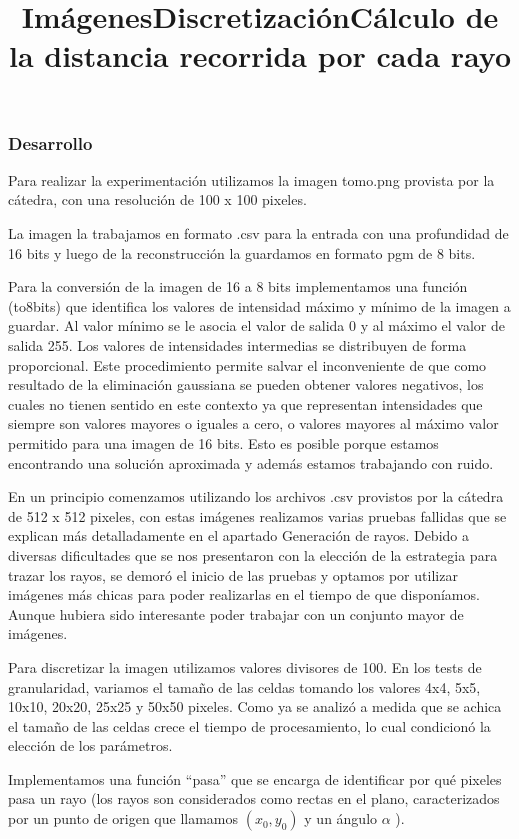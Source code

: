 \subsubsection*{Desarrollo}

\title {Imágenes}

\par Para realizar la experimentación utilizamos la imagen tomo.png provista por la cátedra, con una resolución de 100 x 100 pixeles.
\par La imagen la trabajamos en formato .csv para la entrada con una profundidad de 16 bits y luego de la reconstrucción la guardamos en formato pgm de 8 bits.
\par Para la conversión de la imagen de 16 a 8 bits implementamos una función (to8bits) que identifica los valores de intensidad máximo y mínimo de la imagen a guardar. Al valor mínimo se le asocia el valor de salida 0 y al máximo el valor de salida 255. Los valores de intensidades intermedias se distribuyen de forma proporcional. Este procedimiento permite salvar el inconveniente de que como resultado de la eliminación gaussiana se pueden obtener valores negativos, los cuales no tienen sentido en este contexto ya que representan intensidades que siempre son valores mayores o iguales a cero, o valores mayores al máximo valor permitido para una imagen de 16 bits. Esto es posible porque estamos encontrando una solución aproximada y además estamos trabajando con ruido.

\par En un principio comenzamos utilizando los archivos .csv provistos por la cátedra de 512 x 512 pixeles, con estas imágenes realizamos varias pruebas fallidas que se explican más detalladamente en el apartado Generación de rayos. Debido a diversas dificultades que se nos presentaron con la elección de la estrategia para trazar los rayos, se demoró el inicio de las pruebas y optamos por utilizar imágenes más chicas para poder realizarlas en el tiempo de que disponíamos. Aunque hubiera sido interesante poder trabajar con un conjunto mayor de imágenes.

\title {Discretización} Para discretizar la imagen utilizamos valores divisores de 100. En los tests de granularidad, variamos el tamaño de las celdas tomando los valores 4x4, 5x5, 10x10, 20x20, 25x25 y 50x50 pixeles. Como ya se analizó a medida que se achica el tamaño de las celdas crece el tiempo de procesamiento, lo cual condicionó la elección de los parámetros.

\title {Cálculo de la distancia recorrida por cada rayo} 
Implementamos una función “pasa” que se encarga de identificar por qué pixeles pasa un rayo (los rayos son considerados como rectas en el plano, caracterizados por un punto de origen que llamamos $(x_{0},y_{0})$ y un ángulo $\alpha$ ).

